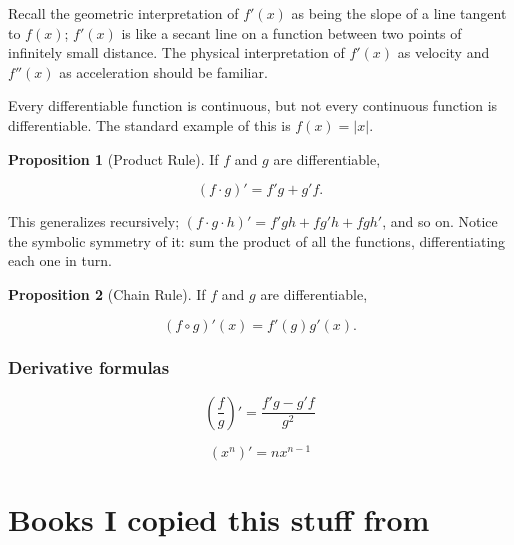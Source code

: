 \documentclass{article}
\theoremstyle{definition}
\newtheorem{proposition}{Proposition}[section]
\begin{document}
Recall the geometric interpretation of $f'(x)$ as being the slope of a line
tangent to $f(x)$; $f'(x)$ is like a secant line on a function between two
points of infinitely small distance. The physical interpretation of $f'(x)$ as
velocity and $f''(x)$ as acceleration should be familiar.

Every differentiable function is continuous, but not every continuous function is differentiable. The standard example of this is $f(x) = |x|$.

\begin{proposition}[Product Rule] 

If $f$ and $g$ are differentiable, 

\begin{equation*}
(f \cdot g)' = f'g + g'f.
\end{equation*}


\end{proposition} 

This generalizes recursively; $(f \cdot g \cdot h)' = f'gh + fg'h + fgh'$, and
so on. Notice the symbolic symmetry of it: sum the product of all the functions,
differentiating each one in turn.

\begin{proposition}[Chain Rule]

If $f$ and $g$ are differentiable,

\begin{equation*}
(f \circ g)'(x) = f'(g)g'(x).
\end{equation*}


\end{proposition}

\subsubsection{Derivative formulas}

\begin{equation*}
\left(\frac{f}{g}\right)' = \frac{f'g - g'f}{g^2}
\end{equation*}

\begin{equation*}
(x^n)' = nx^{n-1}
\end{equation*}

\section{Books I copied this stuff from} \label{bibliography}
\end{document}
